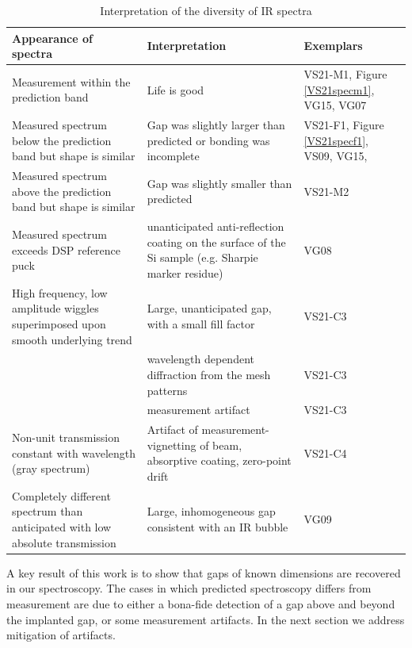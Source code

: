 \documentclass[osajnl,preprint,showpacs,superscriptaddress,12pt]{revtex4-1} %
\begin{document}
\begin{table}[h!]
  \caption{Interpretation of the diversity of IR spectra}
  \begin{center}
    \begin{tabular}{ |p{8cm}| p{8cm} | p{2.2cm} |}
    \hline
    Appearance of spectra & Interpretation & Exemplars \\
    \hline
    Measurement within the prediction band & Life is good & VS21-M1, Figure \ref{VS21specm1}, VG15, VG07\\
    \hline
    Measured spectrum below the prediction band but shape is similar & Gap was slightly larger than predicted or bonding was incomplete& VS21-F1, Figure \ref{VS21specf1}, VS09, VG15, \\
    \hline
    Measured spectrum above the prediction band but shape is similar & Gap was slightly smaller than predicted & VS21-M2\\
    \hline
    Measured spectrum exceeds DSP reference puck & unanticipated anti-reflection coating on the surface of the Si sample (e.g. Sharpie marker residue) & VG08\\
    \hline
    High frequency, low amplitude wiggles superimposed upon smooth underlying trend & Large, unanticipated gap, with a small fill factor  & VS21-C3\\   
     																			     & wavelength dependent diffraction from the mesh patterns & VS21-C3\\       
     																			     & measurement artifact  & VS21-C3\\       												
    \hline
    Non-unit transmission constant with wavelength (gray spectrum) & Artifact of measurement- vignetting of beam, absorptive coating, zero-point drift & VS21-C4 \\
    \hline
    Completely different spectrum than anticipated with low absolute transmission & Large, inhomogeneous gap consistent with an IR bubble & VG09 \\
    \hline
    \end{tabular}
  \end{center}
\end{table}

A key result of this work is to show that gaps of known dimensions are recovered in our spectroscopy.  The cases in which predicted spectroscopy differs from measurement are due to either a bona-fide detection of a gap above and beyond the implanted gap, or some measurement artifacts.  In the next section we address mitigation of artifacts.
\end{document}
